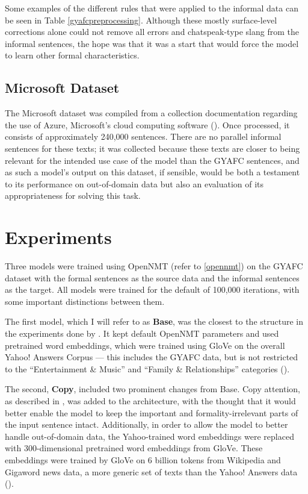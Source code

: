 Some examples of the different rules that were applied to the informal data can be seen in Table \ref{gyafcpreprocessing}. Although these mostly surface-level corrections alone could not remove all errors and chatspeak-type slang from the informal sentences, the hope was that it was a start that would force the model to learn other formal characteristics.

\subsection{Microsoft Dataset}

The Microsoft dataset was compiled from a collection documentation regarding the use of Azure, Microsoft's cloud computing software (\cite{microsoft2019azure}). Once processed, it consists of approximately 240,000 sentences. There are no parallel informal sentences for these texts; it was collected because these texts are closer to being relevant for the intended use case of the model than the GYAFC sentences, and as such a model's output on this dataset, if sensible, would be both a testament to its performance on out-of-domain data but also an evaluation of its appropriateness for solving this task.

\section{Experiments}

Three models were trained using OpenNMT (refer to \ref{opennmt}) on the GYAFC dataset with the formal sentences as the source data and the informal sentences as the target. All models were trained for the default of 100,000 iterations, with some important distinctions between them.

The first model, which I will refer to as \textbf{Base}, was the closest to the structure in the experiments done by \cite{rao2018gyafc}. It kept default OpenNMT parameters and used pretrained word embeddings, which were trained using GloVe on the overall Yahoo! Answers Corpus --- this includes the GYAFC data, but is not restricted to the ``Entertainment \& Music'' and ``Family \& Relationships'' categories (\cite{pennington2014glove}).

The second, \textbf{Copy}, included two prominent changes from Base. Copy attention, as described in \cite{jhamtani2017copy}, was added to the architecture, with the thought that it would better enable the model to keep the important and formality-irrelevant parts of the input sentence intact. Additionally, in order to allow the model to better handle out-of-domain data, the Yahoo-trained word embeddings were replaced with 300-dimensional pretrained word embeddings from GloVe. These embeddings were trained by GloVe on 6 billion tokens from Wikipedia and Gigaword news data, a more generic set of texts than the Yahoo! Answers data (\cite{pennington2014glove}).

